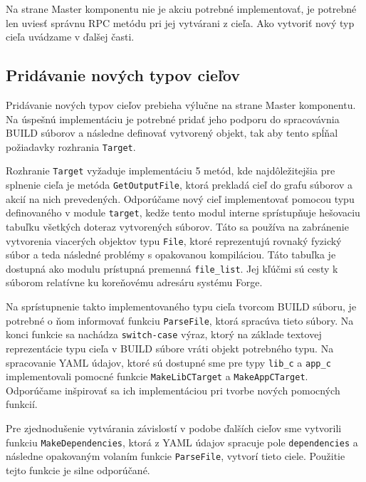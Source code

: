 Na strane Master komponentu nie je akciu potrebné implementovať, je potrebné len
uviesť správnu RPC metódu pri jej vytvárani z cieľa. Ako vytvoriť nový typ cieľa uvádzame
v ďalšej časti.

\subsection{Prid\'{a}vanie nov\'{y}ch typov cie\v{l}ov}
\label{sec:contributing:targets}

Pridávanie nových typov cieľov prebieha výlučne na strane Master komponentu. Na úspešnú
implementáciu je potrebné pridať jeho podporu do spracovávnia BUILD súborov a následne
definovať vytvorený objekt, tak aby tento spĺňal požiadavky rozhrania \texttt{Target}.

Rozhranie \texttt{Target} vyžaduje implementáciu 5 metód, kde najdôležitejšia pre
splnenie cieľa je metóda \texttt{GetOutputFile}, ktorá prekladá cieľ do grafu súborov
a akcií na nich prevedených. Odporúčame nový cieľ implementovať pomocou typu
definovaného v module \texttt{target}, kedže tento modul interne sprístupňuje
hešovaciu tabuľku všetkých doteraz vytvorených súborov. Táto sa používa na zabránenie
vytvorenia viacerých objektov typu \texttt{File}, ktoré reprezentujú rovnaký fyzický
súbor a teda následné problémy s opakovanou kompiláciou. Táto tabuľka je dostupná
ako modulu prístupná premenná \texttt{file\_list}. Jej kľúčmi sú cesty k súborom
relatívne ku koreňovému adresáru systému Forge.

Na sprístupnenie takto implementovaného typu cieľa tvorcom BUILD súboru, je potrebné
o ňom informovať funkciu \texttt{ParseFile}, ktorá spracúva tieto súbory. Na konci
funkcie sa nachádza \texttt{switch-case} výraz, ktorý na základe textovej reprezentácie
typu cieľa v BUILD súbore vráti objekt potrebného typu. Na spracovanie YAML údajov,
ktoré sú dostupné sme pre typy \texttt{lib\_c} a \texttt{app\_c} implementovali
pomocné funkcie \texttt{MakeLibCTarget} a \texttt{MakeAppCTarget}. Odporúčame inšpirovať
sa ich implementáciou pri tvorbe nových pomocných funkcií.

Pre zjednodušenie vytvárania závislostí v podobe ďalších cieľov sme vytvorili
funkciu \texttt{MakeDependencies}, ktorá z YAML údajov spracuje pole \texttt{dependencies}
a následne opakovaným volaním funkcie \texttt{ParseFile}, vytvorí tieto ciele. Použitie
tejto funkcie je silne odporúčané.
